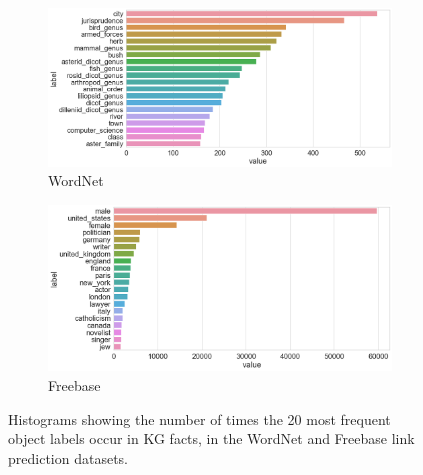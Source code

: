 
\begin{figure}[H]
	\begin{subfigure}[b]{.5\linewidth}
   		\centering
    		\includegraphics[width=1.0\linewidth, height=0.6\linewidth]{Wordnet_Object_Counts}
		\captionsetup{justification=centering}
		\caption{WordNet}
	\end{subfigure}
	\begin{subfigure}[b]{.5\linewidth}
   		\centering
		\includegraphics[width=1.0\linewidth, height=0.6\linewidth]{Freebase_Object_Counts}
		\captionsetup{justification=centering}
		\caption{Freebase}
	\end{subfigure}
	\caption{Histograms showing the number of times the 20 most frequent object labels occur in KG facts, in the WordNet and Freebase link prediction datasets.}
\end{figure}

